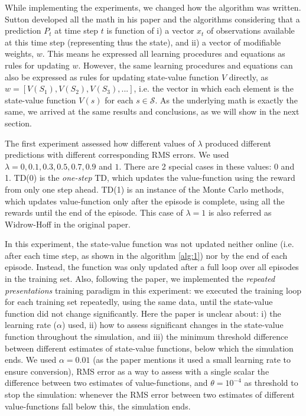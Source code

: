 \documentclass{article}
\begin{document}
While implementing the experiments, we changed how the algorithm was written.
Sutton developed all the math in his paper and the algorithms considering that a prediction $P_{t}$ at time step $t$ is function of i) a vector $x_{t}$ of observations available at this time step (representing thus the state), and ii) a vector of modifiable weights, $w$.
This means he expressed all learning procedures and equations as rules for updating $w$.
However, the same learning procedures and equations can also be expressed as rules for updating state-value function $V$ directly, as $w = [V(S_{1}), V(S_{2}), V(S_{3}), ...]$, i.e. the vector in which each element is the state-value function $V(s)$ for each $s \in \mathcal{S}$.
As the underlying math is exactly the same, we arrived at the same results and conclusions, as we will show in the next section.

The first experiment assessed how different values of $\lambda$ produced different predictions with different corresponding RMS errors.
We used $\lambda = 0, 0.1, 0.3, 0.5, 0.7, 0.9$ and $1$.
There are 2 special cases in these values: 0 and 1.
TD(0) is the \emph{one-step} TD, which updates the value-function using the reward from only one step ahead.
TD(1) is an instance of the Monte Carlo methods, which updates value-function only after the episode is complete, using all the rewards until the end of the episode.
This case of $\lambda = 1$ is also referred as Widrow-Hoff in the original paper.

In this experiment, the state-value function was not updated neither online (i.e. after each time step, as shown in the algorithm \ref{alg:1}) nor by the end of each episode.
Instead, the function was only updated after a full loop over all episodes in the training set.
Also, following the paper, we implemented the \emph{repeated presentations} training paradigm in this experiment: we executed the training loop for each training set repeatedly, using the same data, until the state-value function did not change significantly.
Here the paper is unclear about: i) the learning rate ($\alpha$) used, ii) how to assess significant changes in the state-value function throughout the simulation, and iii) the minimum threshold difference between different estimates of state-value functions, below which the simulation ends.
We used $\alpha = 0.01$ (as the paper mentions it used a small learning rate to ensure conversion), RMS error as a way to assess with a single scalar the difference between two estimates of value-functions, and $\theta = 10^{-4}$ as threshold to stop the simulation: whenever the RMS error between two estimates of different value-functions fall below this, the simulation ends.
\end{document}
